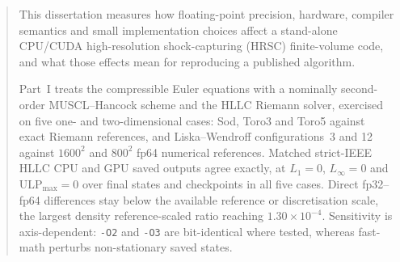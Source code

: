 \begin{abstract}
This dissertation measures how floating-point precision, hardware, compiler
semantics and small implementation choices affect a stand-alone CPU/CUDA
high-resolution shock-capturing (HRSC) finite-volume code, and what those
effects mean for reproducing a published algorithm.

Part~I treats the compressible Euler equations with a nominally second-order
MUSCL--Hancock scheme and the HLLC Riemann solver, exercised on five one- and
two-dimensional cases: Sod, Toro3 and Toro5 against exact Riemann references,
and Liska--Wendroff configurations~3 and 12 against \(1600^2\) and \(800^2\)
fp64 numerical references. Matched strict-IEEE HLLC CPU and GPU saved outputs
agree exactly, at \(L_1=0\), \(L_\infty=0\) and \(\mathrm{ULP}_{\max}=0\) over
final states and checkpoints in all five cases. Direct fp32--fp64 differences
stay below the available reference or discretisation scale, the largest
density reference-scaled ratio reaching \(1.30\times10^{-4}\). Sensitivity is
axis-dependent: \texttt{-O2} and \texttt{-O3} are bit-identical where tested,
whereas fast-math perturbs non-stationary saved states.


\end{abstract}
